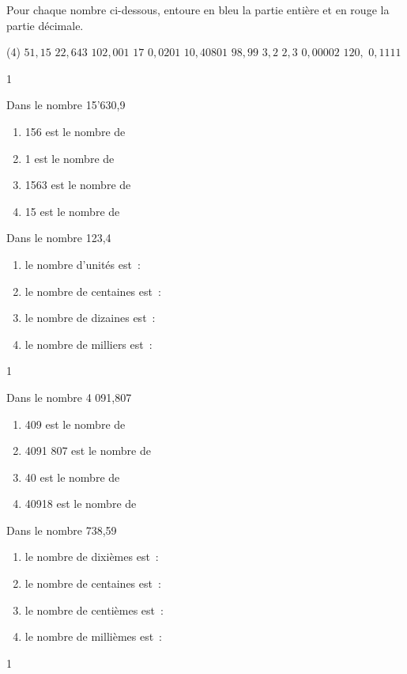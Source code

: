 \documentclass[a4paper,11pt]{report}
\begin{document}
\begin{exop}{
Pour chaque nombre ci-dessous, entoure en bleu la partie entière et en rouge la partie décimale.
\begin{tasks}[after-item-skip = 0.5em](4)
\task $51,\!15$
\task $22,\!643$
\task $102,\!001$
\task $17$
\task $0,0201$
\task $10,\!40801$
\task $98,\!99$
\task $3,\!2$
\task $2,\!3$
\task $0,\!00002$
\task $120,\!$
\task $0,\!1111$
\end{tasks}
}{1}\end{exop}




\begin{exop}{ 
\begin{tasks}[after-item-skip = 0.5em]
\task Dans le nombre 15'630,9
\begin{enumerate}
\item 156 est le nombre de \hrulefill
\item 1 est le nombre de  \hrulefill
\item 1563 est le nombre de \hrulefill
\item 15 est le nombre de  \hrulefill
\end{enumerate}
\task Dans le nombre 123,4
\begin{enumerate}
\item le nombre d'unités est~: \hrulefill
\item le nombre de centaines est~: \hrulefill
\item le nombre de dizaines  est~: \hrulefill
\item le nombre de milliers est~: \hrulefill
\end{enumerate}
\end{tasks}
}{1}\end{exop}

\newpage
\begin{exop}{
\begin{tasks}[after-item-skip = 0.5em]
\task Dans le nombre 4 091,807
\begin{enumerate}[itemsep=7pt]
\item 409 est le nombre de \hrulefill
\item 4091 807 est le nombre de     \hrulefill
\item 40 est le nombre de \hrulefill
\item 40918 est le nombre de  \hrulefill
\end{enumerate}
\task Dans le nombre 738,59
\begin{enumerate}[itemsep=7pt]
\item le nombre de dixièmes est~: \hrulefill
\item le nombre de centaines est~: \hrulefill
\item le nombre de centièmes  est~: \hrulefill
\item le nombre de millièmes est~: \hrulefill
\end{enumerate}
\end{tasks}
}{1}\end{exop}
\end{document}
